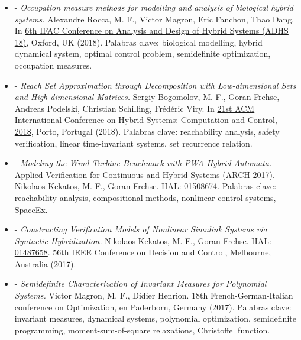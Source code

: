 \documentclass[10pt]{article}
\newenvironment{outerlist}[1][\enskip\textbullet]%
        {\begin{itemize}[#1]}{\end{itemize}%
         \vspace{-.6\baselineskip}}
\begin{document}
\vspace{-0.75cm}

\begin{outerlist}

		\item[-] \emph{Occupation measure methods for modelling and analysis of biological hybrid systems.} Alexandre Rocca, M. F., Victor Magron, Eric Fanchon, Thao Dang.
		In \href{https://www.cs.ox.ac.uk/conferences/ADHS18/}{6th IFAC Conference on Analysis and Design of Hybrid Systems (ADHS 18)}, Oxford, UK (2018). Palabras clave: biological modelling, hybrid dynamical system, optimal control problem, semidefinite optimization, occupation measures.

		\item[-] \emph{Reach Set Approximation through Decomposition with Low-dimensional Sets and High-dimensional Matrices.} Sergiy Bogomolov, M. F., Goran Frehse, Andreas Podelski, Christian Schilling, Frédéric Viry.
		In \href{https://www.hscc2018.deib.polimi.it}{21st ACM International Conference on Hybrid Systems: Computation and Control, 2018}, Porto, Portugal (2018). Palabras clave: reachability analysis, safety verification, linear time-invariant systems, set recurrence relation.

		\item[-] \emph{Modeling the Wind Turbine Benchmark with PWA Hybrid Automata.} Applied Verification for Continuous and Hybrid Systems (ARCH 2017). Nikolaos Kekatos, M. F., Goran Frehse.  \href{https://hal.archives-ouvertes.fr/hal-01508674}{HAL: 01508674}. Palabras clave: reachability analysis, compositional methods, nonlinear control systems, SpaceEx. 

		\item[-] \emph{Constructing Verification Models of Nonlinear Simulink Systems via Syntactic Hybridization.} Nikolaos Kekatos, M. F., Goran Frehse.  \href{https://hal.archives-ouvertes.fr/hal-01487658}{HAL: 01487658}. 56th IEEE Conference on Decision and Control, Melbourne, Australia (2017).
		
		\item[-] \emph{Semidefinite Characterization of Invariant Measures for Polynomial Systems.} Victor Magron, M. F., Didier Henrion. 18th French-German-Italian conference on Optimization, en Paderborn, Germany (2017). Palabras clave: invariant measures, dynamical systems, polynomial optimization, semidefinite programming, moment-sum-of-square relaxations, Christoffel function. 

\end{outerlist}
\end{document}
